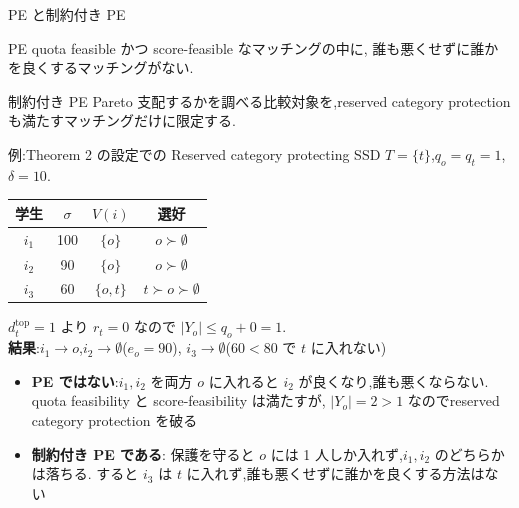 \documentclass[aspectratio=43,11pt]{beamer}
\newcommand{\topf}{\mathrm{top}}
\newcommand{\dtop}[1]{d^{\topf}_{#1}}
\begin{document}
\begin{frame}{PE と制約付き PE}
\small
\begin{block}{PE}
  quota feasible かつ score-feasible なマッチングの中に,
  誰も悪くせずに誰かを良くするマッチングがない.
\end{block}
\begin{block}{制約付き PE}
  Pareto 支配するかを調べる比較対象を,\alert{reserved category protection も満たすマッチングだけ}に限定する.
\end{block}
\end{frame}

\begin{frame}{例:Theorem 2 の設定での Reserved category protecting SSD}
\small
$T=\{t\}$,$q_o=q_t=1$,$\delta=10$.
\begin{center}
\renewcommand{\arraystretch}{1.1}
\begin{tabular}{cccc}
  \toprule
  学生 & $\sigma$ & $V(i)$ & 選好 \\
  \midrule
  $i_1$ & 100 & $\{o\}$ & $o \succ \emptyset$ \\
  $i_2$ & 90 & $\{o\}$ & $o \succ \emptyset$ \\
  $i_3$ & 60 & $\{o, t\}$ & $t \succ o \succ \emptyset$ \\
  \bottomrule
\end{tabular}
\end{center}
$\dtop{t} = 1$ より $r_t = 0$ なので $|Y_o| \leq q_o + 0 = 1$.\\
\textbf{結果}:$i_1\to o$,$i_2\to\emptyset$($e_o=90$),
$i_3\to\emptyset$($60<80$ で $t$ に入れない)
\begin{itemize}
  \item \textbf{PE ではない}:$i_1,i_2$ を両方 $o$ に入れると $i_2$ が良くなり,誰も悪くならない.
        quota feasibility と score-feasibility は満たすが,
        $|Y_o| = 2 > 1$ なので\alert{reserved category protection を破る}
  \item \textbf{制約付き PE である}:
        保護を守ると $o$ には 1 人しか入れず,$i_1,i_2$ のどちらかは落ちる.
        すると $i_3$ は $t$ に入れず,誰も悪くせずに誰かを良くする方法はない
\end{itemize}
\end{frame}
\end{document}
